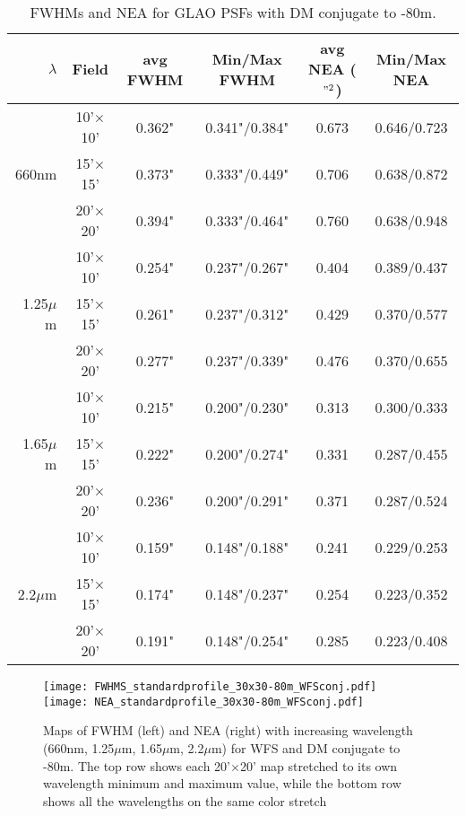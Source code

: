 \documentclass[aas_macros,10pt]{article}
\begin{document}
 \begin{table}[ht]
\centering
\caption{FWHMs and NEA for GLAO PSFs with DM conjugate to -80m.}
\begin{tabular}{||r|c|c|c||c|c||} \hline\hline
$\lambda$ & Field & avg FWHM & Min/Max FWHM & avg NEA ($"^2$) & Min/Max NEA \\ \hline\hline
		& 10'$\times$10' & 0.362" & 0.341"/0.384" & 0.673 & 0.646/0.723 \\ \cline{2-6}
660nm  & 15'$\times$15' & 0.373" & 0.333"/0.449" & 0.706 & 0.638/0.872 \\ \cline{2-6}
		& 20'$\times$20' & 0.394" &  0.333"/0.464" & 0.760 & 0.638/0.948 \\ \hline \hline
		& 10'$\times$10' & 0.254" & 0.237"/0.267" & 0.404 & 0.389/0.437 \\ \cline{2-6}
1.25$\mu$m & 15'$\times$15' & 0.261" & 0.237"/0.312" & 0.429 & 0.370/0.577 \\ \cline{2-6}
		& 20'$\times$20' & 0.277" & 0.237"/0.339" & 0.476 & 0.370/0.655 \\ \hline \hline
		& 10'$\times$10' & 0.215" & 0.200"/0.230" & 0.313 & 0.300/0.333 \\ \cline{2-6}
1.65$\mu$m & 15'$\times$15' & 0.222" & 0.200"/0.274" & 0.331 & 0.287/0.455 \\ \cline{2-6}
		& 20'$\times$20' & 0.236" & 0.200"/0.291" & 0.371 & 0.287/0.524 \\ \hline\hline
		& 10'$\times$10' & 0.159" & 0.148"/0.188" & 0.241 & 0.229/0.253 \\ \cline{2-6}
2.2$\mu$m & 15'$\times$15' & 0.174" & 0.148"/0.237" & 0.254 & 0.223/0.352 \\ \cline{2-6}
		& 20'$\times$20' & 0.191" & 0.148"/0.254" & 0.285 & 0.223/0.408 \\ \hline\hline
\end{tabular}
\label{tab:n80mconjugation2}
\end{table}

\begin{figure}[ht]
\centering
\texttt{[image: FWHMS\_standardprofile\_30x30-80m\_WFSconj.pdf]}
\texttt{[image: NEA\_standardprofile\_30x30-80m\_WFSconj.pdf]}
\caption{Maps of FWHM (left) and NEA (right) with increasing wavelength (660nm, 1.25$\mu$m, 1.65$\mu$m, 2.2$\mu$m) for WFS and DM conjugate to -80m. The top row shows each 20'$\times$20' map stretched to its own wavelength minimum and maximum value, while the bottom row shows all the wavelengths on the same color stretch}
\label{fig:n80mconjugation2}
\end{figure}
\end{document}
